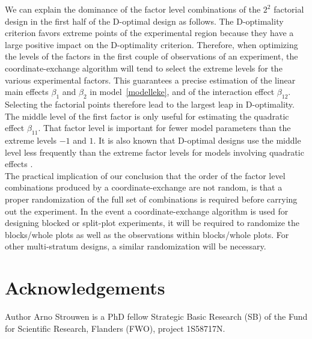 
We can explain the dominance of the factor level combinations of the $2^2$ factorial design in the first half of the D-optimal design as follows. The D-optimality criterion favors extreme points of the experimental region because they have a large positive impact on the D-optimality criterion. Therefore, when optimizing the levels of the factors in the first couple of observations of an experiment, the coordinate-exchange algorithm will tend to select the extreme levels for the various experimental factors. This guarantees a precise estimation of the linear main effects $\beta_1$ and $\beta_2$ in model~\eqref{modelleke}, and of the interaction effect $\beta_{12}$. Selecting the factorial points therefore lead to the largest leap in D-optimality. The middle level of the first factor is only useful for estimating the quadratic effect $\beta_{11}$. That factor level is important for fewer model parameters than the extreme levels $-1$ and $1$. It is also known that D-optimal designs use the middle level less frequently than the extreme factor levels for models involving quadratic effects \citep{atdoto}.\\

The practical implication of our conclusion that the order of the factor level combinations produced by a coordinate-exchange are not random, is that a proper randomization of the full set of combinations is required before carrying out the experiment. In the event a coordinate-exchange algorithm is used for designing blocked or split-plot experiments, it will be required to randomize the blocks/whole plots as well as the observations within blocks/whole plots. For other multi-stratum designs, a similar randomization will be necessary.
 
\section*{Acknowledgements}
Author Arno Strouwen is a PhD fellow Strategic Basic Research (SB) of the Fund for
Scientific Research, Flanders (FWO), project 1S58717N.
\small



